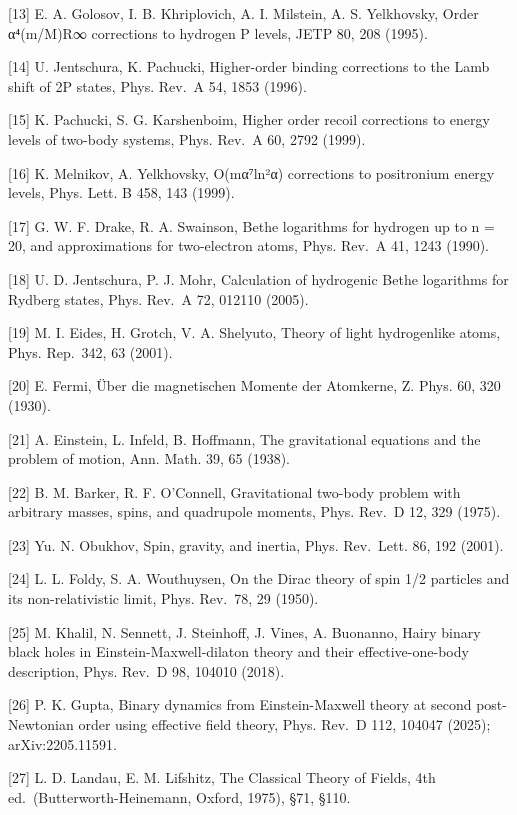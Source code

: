 \documentclass[
  a4paper,
]{article}
\begin{document}
{[}13{]} E. A. Golosov, I. B. Khriplovich, A. I. Milstein, A. S.
Yelkhovsky, Order α⁴(m/M)R∞ corrections to hydrogen P levels, JETP 80,
208 (1995).

{[}14{]} U. Jentschura, K. Pachucki, Higher-order binding corrections to
the Lamb shift of 2P states, Phys. Rev.~A 54, 1853 (1996).

{[}15{]} K. Pachucki, S. G. Karshenboim, Higher order recoil corrections
to energy levels of two-body systems, Phys. Rev.~A 60, 2792 (1999).

{[}16{]} K. Melnikov, A. Yelkhovsky, O(mα⁷ln²α) corrections to
positronium energy levels, Phys. Lett. B 458, 143 (1999).

{[}17{]} G. W. F. Drake, R. A. Swainson, Bethe logarithms for hydrogen
up to n = 20, and approximations for two-electron atoms, Phys. Rev.~A
41, 1243 (1990).

{[}18{]} U. D. Jentschura, P. J. Mohr, Calculation of hydrogenic Bethe
logarithms for Rydberg states, Phys. Rev.~A 72, 012110 (2005).

{[}19{]} M. I. Eides, H. Grotch, V. A. Shelyuto, Theory of light
hydrogenlike atoms, Phys. Rep.~342, 63 (2001).

{[}20{]} E. Fermi, Über die magnetischen Momente der Atomkerne, Z. Phys.
60, 320 (1930).

{[}21{]} A. Einstein, L. Infeld, B. Hoffmann, The gravitational
equations and the problem of motion, Ann. Math. 39, 65 (1938).

{[}22{]} B. M. Barker, R. F. O'Connell, Gravitational two-body problem
with arbitrary masses, spins, and quadrupole moments, Phys. Rev.~D 12,
329 (1975).

{[}23{]} Yu. N. Obukhov, Spin, gravity, and inertia, Phys. Rev.~Lett.
86, 192 (2001).

{[}24{]} L. L. Foldy, S. A. Wouthuysen, On the Dirac theory of spin 1/2
particles and its non-relativistic limit, Phys. Rev.~78, 29 (1950).

{[}25{]} M. Khalil, N. Sennett, J. Steinhoff, J. Vines, A. Buonanno,
Hairy binary black holes in Einstein-Maxwell-dilaton theory and their
effective-one-body description, Phys. Rev.~D 98, 104010 (2018).

{[}26{]} P. K. Gupta, Binary dynamics from Einstein-Maxwell theory at
second post-Newtonian order using effective field theory, Phys. Rev.~D
112, 104047 (2025); arXiv:2205.11591.

{[}27{]} L. D. Landau, E. M. Lifshitz, The Classical Theory of Fields,
4th ed.~(Butterworth-Heinemann, Oxford, 1975), §71, §110.
\end{document}
